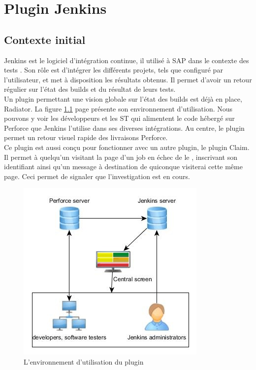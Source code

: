 \chapter{Plugin Jenkins}

\section{Contexte initial}

Jenkins est le logiciel d'intégration continue, il utilisé à SAP dans le contexte des tests . Son rôle est d'intégrer les différents projets, tels que configuré par l'utilisateur, et met à disposition les résultats obtenus. Il permet d'avoir un retour régulier sur l'état des builds et du résultat de leurs tests.\\

Un plugin permettant une vision globale sur l'état des builds est déjà en place, Radiator. La figure \ref{figure:reportingPluginEnvironmentAfter} page \pageref{figure:reportingPluginEnvironmentAfter} présente son environnement d'utilisation. Nous pouvons y voir les développeurs et les ST qui alimentent le code hébergé sur Perforce que Jenkins l'utilise dans ses diverses intégrations. Au centre, le plugin permet un retour visuel rapide des livraisons Perforce.\\
Ce plugin est aussi conçu pour fonctionner avec un autre plugin, le plugin Claim. Il permet à quelqu'un visitant la page d'un job en échec de le , inscrivant son identifiant ainsi qu'un message à destination de quiconque visiterai cette même page. Ceci permet de signaler que l'investigation est en cours.\\

\begin{figure}[!h]
  \centering
      \includegraphics{images/reportingPluginEnvironmentAfter.jpg}
  \caption{L'environnement d'utilisation du plugin}
	\label{figure:reportingPluginEnvironmentAfter}
\end{figure}

